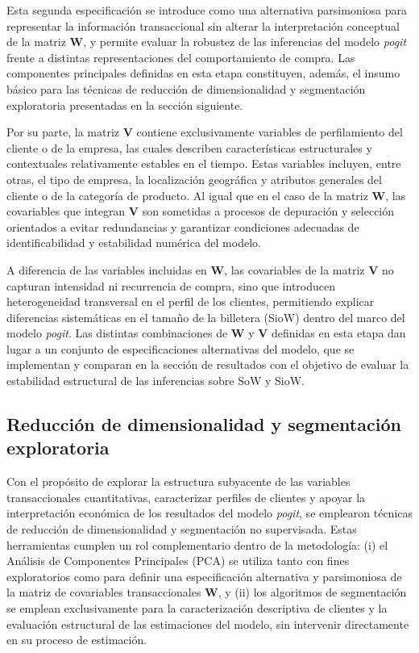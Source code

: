     Esta segunda especificación se introduce como una alternativa parsimoniosa para representar la información transaccional sin alterar la interpretación conceptual de la matriz $\mathbf{W}$, y permite evaluar la robustez de las inferencias del modelo \emph{pogit} frente a distintas representaciones del comportamiento de compra. Las componentes principales definidas en esta etapa constituyen, además, el insumo básico para las técnicas de reducción de dimensionalidad y segmentación exploratoria presentadas en la sección siguiente.
    
    Por su parte, la matriz $\mathbf{V}$ contiene exclusivamente variables de perfilamiento del cliente o de la empresa, las cuales describen características estructurales y contextuales relativamente estables en el tiempo. Estas variables incluyen, entre otras, el tipo de empresa, la localización geográfica y atributos generales del cliente o de la categoría de producto. Al igual que en el caso de la matriz $\mathbf{W}$, las covariables que integran $\mathbf{V}$ son sometidas a procesos de depuración y selección orientados a evitar redundancias y garantizar condiciones adecuadas de identificabilidad y estabilidad numérica del modelo.
    
    A diferencia de las variables incluidas en $\mathbf{W}$, las covariables de la matriz $\mathbf{V}$ no capturan intensidad ni recurrencia de compra, sino que introducen heterogeneidad transversal en el perfil de los clientes, permitiendo explicar diferencias sistemáticas en el tamaño de la billetera (SioW) dentro del marco del modelo \emph{pogit}. Las distintas combinaciones de $\mathbf{W}$ y $\mathbf{V}$ definidas en esta etapa dan lugar a un conjunto de especificaciones alternativas del modelo, que se implementan y comparan en la sección de resultados con el objetivo de evaluar la estabilidad estructural de las inferencias sobre SoW y SioW.

\subsection{Reducción de dimensionalidad y segmentación exploratoria}
\label{sec:pca_segmentacion}

    Con el propósito de explorar la estructura subyacente de las variables transaccionales cuantitativas, caracterizar perfiles de clientes y apoyar la interpretación económica de los resultados del modelo \emph{pogit}, se emplearon técnicas de reducción de dimensionalidad y segmentación no supervisada. Estas herramientas cumplen un rol complementario dentro de la metodología: (i) el Análisis de Componentes Principales (PCA) se utiliza tanto con fines exploratorios como para definir una especificación alternativa y parsimoniosa de la matriz de covariables transaccionales $\mathbf{W}$, y (ii) los algoritmos de segmentación se emplean exclusivamente para la caracterización descriptiva de clientes y la evaluación estructural de las estimaciones del modelo, sin intervenir directamente en su proceso de estimación.
    
